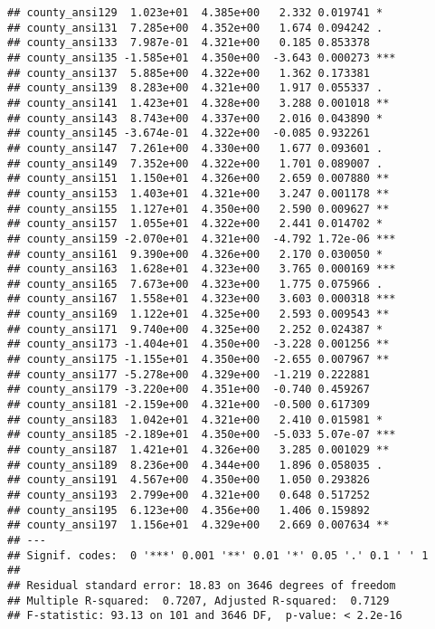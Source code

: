 \documentclass[
]{book}
\begin{document}
\begin{verbatim}
## county_ansi129  1.023e+01  4.385e+00   2.332 0.019741 *  
## county_ansi131  7.285e+00  4.352e+00   1.674 0.094242 .  
## county_ansi133  7.987e-01  4.321e+00   0.185 0.853378    
## county_ansi135 -1.585e+01  4.350e+00  -3.643 0.000273 ***
## county_ansi137  5.885e+00  4.322e+00   1.362 0.173381    
## county_ansi139  8.283e+00  4.321e+00   1.917 0.055337 .  
## county_ansi141  1.423e+01  4.328e+00   3.288 0.001018 ** 
## county_ansi143  8.743e+00  4.337e+00   2.016 0.043890 *  
## county_ansi145 -3.674e-01  4.322e+00  -0.085 0.932261    
## county_ansi147  7.261e+00  4.330e+00   1.677 0.093601 .  
## county_ansi149  7.352e+00  4.322e+00   1.701 0.089007 .  
## county_ansi151  1.150e+01  4.326e+00   2.659 0.007880 ** 
## county_ansi153  1.403e+01  4.321e+00   3.247 0.001178 ** 
## county_ansi155  1.127e+01  4.350e+00   2.590 0.009627 ** 
## county_ansi157  1.055e+01  4.322e+00   2.441 0.014702 *  
## county_ansi159 -2.070e+01  4.321e+00  -4.792 1.72e-06 ***
## county_ansi161  9.390e+00  4.326e+00   2.170 0.030050 *  
## county_ansi163  1.628e+01  4.323e+00   3.765 0.000169 ***
## county_ansi165  7.673e+00  4.323e+00   1.775 0.075966 .  
## county_ansi167  1.558e+01  4.323e+00   3.603 0.000318 ***
## county_ansi169  1.122e+01  4.325e+00   2.593 0.009543 ** 
## county_ansi171  9.740e+00  4.325e+00   2.252 0.024387 *  
## county_ansi173 -1.404e+01  4.350e+00  -3.228 0.001256 ** 
## county_ansi175 -1.155e+01  4.350e+00  -2.655 0.007967 ** 
## county_ansi177 -5.278e+00  4.329e+00  -1.219 0.222881    
## county_ansi179 -3.220e+00  4.351e+00  -0.740 0.459267    
## county_ansi181 -2.159e+00  4.321e+00  -0.500 0.617309    
## county_ansi183  1.042e+01  4.321e+00   2.410 0.015981 *  
## county_ansi185 -2.189e+01  4.350e+00  -5.033 5.07e-07 ***
## county_ansi187  1.421e+01  4.326e+00   3.285 0.001029 ** 
## county_ansi189  8.236e+00  4.344e+00   1.896 0.058035 .  
## county_ansi191  4.567e+00  4.350e+00   1.050 0.293826    
## county_ansi193  2.799e+00  4.321e+00   0.648 0.517252    
## county_ansi195  6.123e+00  4.356e+00   1.406 0.159892    
## county_ansi197  1.156e+01  4.329e+00   2.669 0.007634 ** 
## ---
## Signif. codes:  0 '***' 0.001 '**' 0.01 '*' 0.05 '.' 0.1 ' ' 1
## 
## Residual standard error: 18.83 on 3646 degrees of freedom
## Multiple R-squared:  0.7207, Adjusted R-squared:  0.7129 
## F-statistic: 93.13 on 101 and 3646 DF,  p-value: < 2.2e-16
\end{verbatim}
\end{document}
